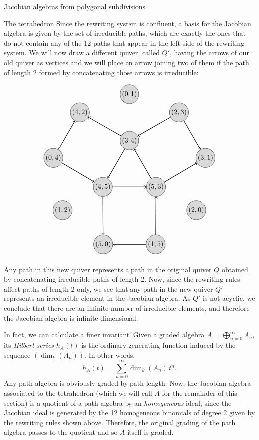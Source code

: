 \begin{chapter}{Jacobian algebras from polygonal subdivisions}
\begin{section}{The tetrahedron}
Since the rewriting system is confluent, a basis for the Jacobian algebra is given by the set of irreducible paths, which are exactly the ones that do not contain any of the 12 paths that appear in the left side of the rewriting system. We will now draw a different quiver, called $Q'$, having the arrows of our old quiver as vertices and we will place an arrow joining two of them if the path of length 2 formed by concatenating those arrows is irreducible:

\[
\begin{tikzpicture}[->, thick, scale=1.3]
\tikzstyle{every node} = [circle, fill=gray!30, minimum size=.5cm, inner sep=.04cm, draw=black, thin]
\node (1) at (90:1.2) {$(3,4)$};
\node (2) at (210:1.2) {$(4,5)$};
\node (3) at (330:1.2) {$(5,3)$};
\node (4) at (10:3) {$(3,1)$};
\node (5) at (50:3) {$(2,3)$};
\node (6) at (130:3) {$(4,2)$};
\node (7) at (170:3) {$(0,4)$};
\node (8) at (250:3) {$(5,0)$};
\node (9) at (290:3) {$(1,5)$};
\node (10) at (90:3) {$(0,1)$};
\node (11) at (210:3) {$(1,2)$};
\node (12) at (330:3) {$(2,0)$};
\tikzstyle{every node} = []
\draw (1) -- (2);
\draw (2) -- (3);
\draw (3) -- (1);
\draw (3) -- (4);
\draw (5) -- (4);
\draw (5) -- (1);
\draw (1) -- (6);
\draw (7) -- (6);
\draw (7) -- (2);
\draw (9) -- (8);
\draw (9) -- (3);
\draw (2) -- (8);
\end{tikzpicture}
\]

Any path in this new quiver represents a path in the original quiver $Q$ obtained by concatenating irreducible paths of length 2. Now, since the rewriting rules affect paths of length 2 only, we see that any path in the new quiver $Q'$ represents an irreducible element in the Jacobian algebra. As $Q'$ is not acyclic, we conclude that there are an infinite number of irreducible elements, and therefore the Jacobian algebra is infinite-dimensional.

In fact, we can calculate a finer invariant. Given a graded algebra $A=\bigoplus_{n=0}^\infty A_n$, its \emph{Hilbert series} $h_A(t)$ is the ordinary generating function induced by the sequence $(\dim_k(A_n))$. In other words,
\[h_A(t) = \sum_{n=0}^\infty \dim_k(A_n)\,t^n.\]
Any path algebra is obviously graded by path length. Now, the Jacobian algebra associated to the tetrahedron (which we will call $A$ for the remainder of this section) is a quotient of a path algebra by an \emph{homogeneous} ideal, since the Jacobian ideal is generated by the 12 homogeneous binomials of degree 2 given by the rewriting rules shown above. Therefore, the original grading of the path algebra passes to the quotient and so $A$ itself is graded. 


\end{section}
\end{chapter}
